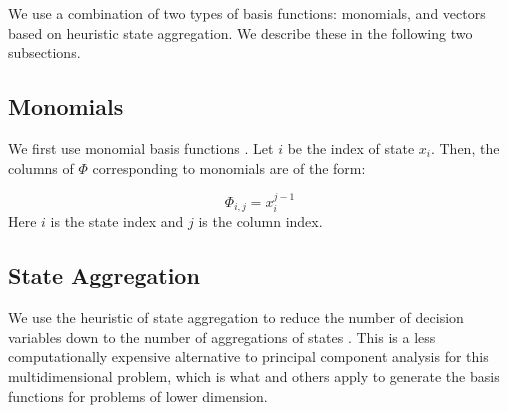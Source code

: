 \documentclass[conference]{IEEEtran}
\begin{document}
We use a combination of two types of basis functions: monomials, and vectors based on heuristic state aggregation. We describe these in the following two subsections.

\subsection{Monomials}
    We first use monomial basis functions \cite{bertsekas1995dynamic,478953}. Let $i$ be the index of state $x_{i}$. Then, the columns of $\Phi$ corresponding to monomials are of the form:
	
	\begin{displaymath}
        \Phi_{i,j}=x_{i}^{j-1}
    \end{displaymath} Here $i$ is the state index and $j$ is the column index. %



 \subsection{State Aggregation}
    
    We use the heuristic of state aggregation to reduce the number of decision variables down to the number of aggregations of states \cite{5717627}. This is a less computationally expensive alternative to principal component analysis for this multidimensional problem, which is what \cite{PCA2015} and others apply to generate the basis functions for problems of lower dimension.%
    
\end{document}
